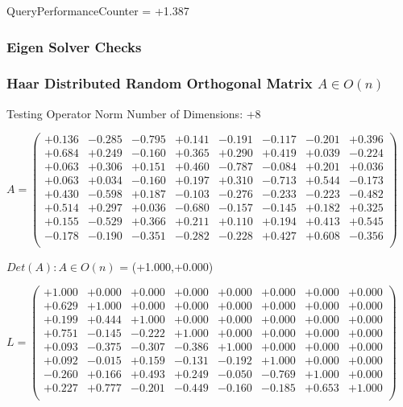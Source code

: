 \documentclass[9pt]{article}
\theoremstyle{plain}
\theoremstyle{definition}
\theoremstyle{remark}
\numberwithin{equation}{section}
\begin{document}
QueryPerformanceCounter  =  +1.387
\subsubsection{Eigen Solver Checks}
\subsubsection{Haar Distributed Random Orthogonal Matrix $A \in O(n)$}
 Testing Operator Norm
Number of Dimensions: +8

$A = \left(
\begin{array}{
cccccccc}
+0.136 & -0.285 & -0.795 & +0.141 & -0.191 & -0.117 & -0.201 & +0.396 \\
+0.684 & +0.249 & -0.160 & +0.365 & +0.290 & +0.419 & +0.039 & -0.224 \\
+0.063 & +0.306 & +0.151 & +0.460 & -0.787 & -0.084 & +0.201 & +0.036 \\
+0.063 & +0.034 & -0.160 & +0.197 & +0.310 & -0.713 & +0.544 & -0.173 \\
+0.430 & -0.598 & +0.187 & -0.103 & -0.276 & -0.233 & -0.223 & -0.482 \\
+0.514 & +0.297 & +0.036 & -0.680 & -0.157 & -0.145 & +0.182 & +0.325 \\
+0.155 & -0.529 & +0.366 & +0.211 & +0.110 & +0.194 & +0.413 & +0.545 \\
-0.178 & -0.190 & -0.351 & -0.282 & -0.228 & +0.427 & +0.608 & -0.356 \\
\end{array}
\right)$ \newline 

$Det(A) :   A \in O(n)$ = (+1.000,+0.000)

$L = \left(
\begin{array}{
cccccccc}
+1.000 & +0.000 & +0.000 & +0.000 & +0.000 & +0.000 & +0.000 & +0.000 \\
+0.629 & +1.000 & +0.000 & +0.000 & +0.000 & +0.000 & +0.000 & +0.000 \\
+0.199 & +0.444 & +1.000 & +0.000 & +0.000 & +0.000 & +0.000 & +0.000 \\
+0.751 & -0.145 & -0.222 & +1.000 & +0.000 & +0.000 & +0.000 & +0.000 \\
+0.093 & -0.375 & -0.307 & -0.386 & +1.000 & +0.000 & +0.000 & +0.000 \\
+0.092 & -0.015 & +0.159 & -0.131 & -0.192 & +1.000 & +0.000 & +0.000 \\
-0.260 & +0.166 & +0.493 & +0.249 & -0.050 & -0.769 & +1.000 & +0.000 \\
+0.227 & +0.777 & -0.201 & -0.449 & -0.160 & -0.185 & +0.653 & +1.000 \\
\end{array}
\right)$ \newline 
\end{document}
